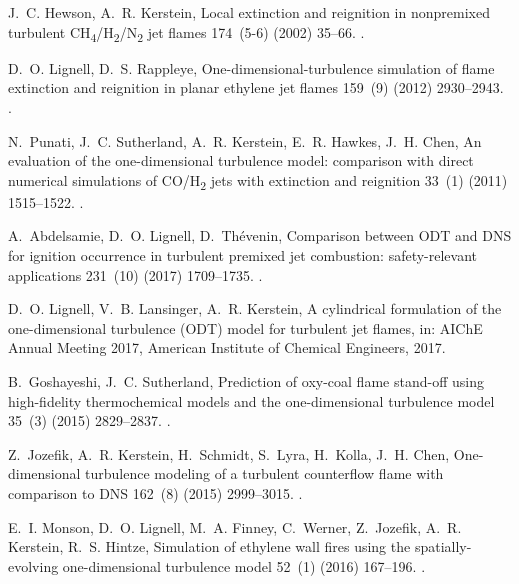 \documentclass[preprint,12pt, a4paper]{elsarticle}
\begin{document}
\begin{thebibliography}{10}
J.~C. Hewson, A.~R. Kerstein, Local extinction and reignition in nonpremixed
  turbulent {CH}\textsubscript{4}/{H}\textsubscript{2}/{N}\textsubscript{2} jet
  flames 174~(5-6) (2002) 35--66.
\newblock \href {http://dx.doi.org/10.1080/713713031}
  {}.

D.~O. Lignell, D.~S. Rappleye, One-dimensional-turbulence simulation of flame
  extinction and reignition in planar ethylene jet flames 159~(9) (2012)
  2930--2943.
\newblock \href {http://dx.doi.org/10.1016/j.combustflame.2012.03.018}
  {}.

N.~Punati, J.~C. Sutherland, A.~R. Kerstein, E.~R. Hawkes, J.~H. Chen, An
  evaluation of the one-dimensional turbulence model: comparison with direct
  numerical simulations of {CO}/{H}\textsubscript{2 }jets with extinction and
  reignition 33~(1) (2011) 1515--1522.
\newblock \href {http://dx.doi.org/10.1016/j.proci.2010.06.127}
  {}.

A.~Abdelsamie, D.~O. Lignell, D.~Th{\'e}venin, Comparison between {ODT} and
  {DNS} for ignition occurrence in turbulent premixed jet combustion:
  safety-relevant applications 231~(10) (2017) 1709--1735.
\newblock \href {http://dx.doi.org/10.1515/zpch-2016-0902}
  {}.

D.~O. Lignell, V.~B. Lansinger, A.~R. Kerstein, A cylindrical formulation of
  the one-dimensional turbulence ({ODT}) model for turbulent jet flames, in:
  AIChE Annual Meeting 2017, {American Institute of Chemical Engineers}, 2017.

B.~Goshayeshi, J.~C. Sutherland, Prediction of oxy-coal flame stand-off using
  high-fidelity thermochemical models and the one-dimensional turbulence model
  35~(3) (2015) 2829--2837.
\newblock \href {http://dx.doi.org/10.1016/j.proci.2014.07.003}
  {}.

Z.~Jozefik, A.~R. Kerstein, H.~Schmidt, S.~Lyra, H.~Kolla, J.~H. Chen,
  One-dimensional turbulence modeling of a turbulent counterflow flame with
  comparison to {DNS} 162~(8) (2015) 2999--3015.
\newblock \href {http://dx.doi.org/10.1016/j.combustflame.2015.05.010}
  {}.

E.~I. Monson, D.~O. Lignell, M.~A. Finney, C.~Werner, Z.~Jozefik, A.~R.
  Kerstein, R.~S. Hintze, Simulation of ethylene wall fires using the
  spatially-evolving one-dimensional turbulence model 52~(1) (2016) 167--196.
\newblock \href {http://dx.doi.org/10.1007/s10694-014-0441-2}
  {}.


\end{thebibliography}
\end{document}
